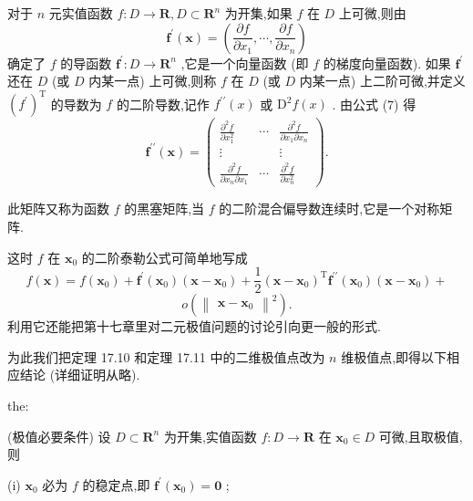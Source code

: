 对于 \(n\) 元实值函数 \(f : D \rightarrow  \mathbf{R},D \subset  {\mathbf{R}}^{n}\) 为开集,如果 \(f\) 在 \(D\) 上可微,则由
\[
{\mathbf{f}}^{\prime }\left( \mathbf{x}\right)  = \left( {\frac{\partial f}{\partial {x}_{1}},\cdots ,\frac{\partial f}{\partial {x}_{n}}}\right)
\]
确定了 \(f\) 的导函数 \({\mathbf{f}}^{\prime } : D \rightarrow  {\mathbf{R}}^{n}\) ,它是一个向量函数 (即 \(f\) 的梯度向量函数). 如果 \({\mathbf{f}}^{\prime }\) 还在 \(D\) (或 \(D\) 内某一点) 上可微,则称 \(f\) 在 \(D\) (或 \(D\) 内某一点) 上二阶可微,并定义 \({\left( {f}^{\prime }\right) }^{\mathrm{T}}\) 的导数为 \(f\) 的二阶导数,记作 \({f}^{\prime \prime }\left( x\right)\) 或 \({\mathrm{D}}^{2}f\left( x\right)\) . 由公式 (7) 得
\[
{\mathbf{f}}^{\prime \prime }\left( \mathbf{x}\right)  = \left( \begin{matrix} \frac{{\partial }^{2}f}{\partial {x}_{1}^{2}} & \cdots & \frac{{\partial }^{2}f}{\partial {x}_{1}\partial {x}_{n}} \\  \vdots & & \vdots \\  \frac{{\partial }^{2}f}{\partial {x}_{n}\partial {x}_{1}} & \cdots & \frac{{\partial }^{2}f}{\partial {x}_{n}^{2}} \end{matrix}\right) . \tag{19}
\]


此矩阵又称为函数 \(f\) 的黑塞矩阵,当 \(f\) 的二阶混合偏导数连续时,它是一个对称矩阵.

这时 \(f\) 在 \({\mathbf{x}}_{0}\) 的二阶泰勒公式可简单地写成
\[
f\left( \mathbf{x}\right)  = f\left( {\mathbf{x}}_{0}\right)  + {\mathbf{f}}^{\prime }\left( {\mathbf{x}}_{0}\right) \left( {\mathbf{x} - {\mathbf{x}}_{0}}\right)  + \frac{1}{2}{\left( \mathbf{x} - {\mathbf{x}}_{0}\right) }^{\mathrm{T}}{\mathbf{f}}^{\prime \prime }\left( {\mathbf{x}}_{0}\right) \left( {\mathbf{x} - {\mathbf{x}}_{0}}\right)  +
\]
\[
o\left( {\begin{Vmatrix}\mathbf{x} - {\mathbf{x}}_{0}\end{Vmatrix}}^{2}\right) . \tag{20}
\]
利用它还能把第十七章里对二元极值问题的讨论引向更一般的形式.

为此我们把定理 17.10 和定理 17.11 中的二维极值点改为 \(n\) 维极值点,即得以下相应结论 (详细证明从略).

\begin{theorem}{}{the:}

\end{theorem}
 (极值必要条件) 设 \(D \subset  {\mathbf{R}}^{n}\) 为开集,实值函数 \(f : D \rightarrow  \mathbf{R}\) 在 \({\mathbf{x}}_{0} \in  D\) 可微,且取极值,则

(i) \({\mathbf{x}}_{0}\) 必为 \(f\) 的稳定点,即 \({\mathbf{f}}^{\prime }\left( {\mathbf{x}}_{0}\right)  = \mathbf{0}\) ;

